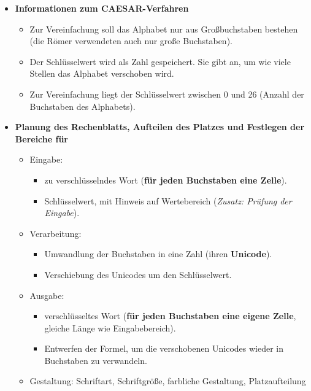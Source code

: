 \documentclass[10pt, a4paper]{arbeitsblatt}
\begin{document}
\begin{itemize}
	\item \textbf{Informationen zum CAESAR-Verfahren}
	      \begin{itemize}
		      \item Zur Vereinfachung soll das Alphabet nur aus Großbuchstaben bestehen (die Römer
		            verwendeten auch nur große Buchstaben).
		      \item Der Schlüsselwert wird als Zahl gespeichert. Sie gibt an, um wie viele Stellen
		            das Alphabet verschoben wird.
		      \item Zur Vereinfachung liegt der Schlüsselwert zwischen 0 und 26 (Anzahl der
		            Buchstaben des Alphabets).
	      \end{itemize}
	\item \textbf{Planung des Rechenblatts, Aufteilen des Platzes und Festlegen der Bereiche für}
	      \begin{itemize}
		      \item Eingabe:
		            \begin{itemize}
			            \item zu verschlüsselndes Wort (\textbf{für jeden Buchstaben eine Zelle}).
			            \item Schlüsselwert, mit Hinweis auf Wertebereich (\textit{Zusatz: Prüfung der Eingabe}).
		            \end{itemize}
		      \item Verarbeitung:
		            \begin{itemize}
			            \item Umwandlung der Buchstaben in eine Zahl (ihren \textbf{Unicode}).
			            \item Verschiebung des Unicodes um den Schlüsselwert.
		            \end{itemize}
		      \item Ausgabe:
		            \begin{itemize}
			            \item verschlüsseltes Wort (\textbf{für jeden Buchstaben eine eigene Zelle}, gleiche Länge wie Eingabebereich).
			            \item Entwerfen der Formel, um die verschobenen Unicodes wieder in Buchstaben zu
			                  verwandeln.
		            \end{itemize}
		      \item Gestaltung: Schriftart, Schriftgröße, farbliche Gestaltung, Platzaufteilung
	      \end{itemize}
\end{itemize}
\end{document}
